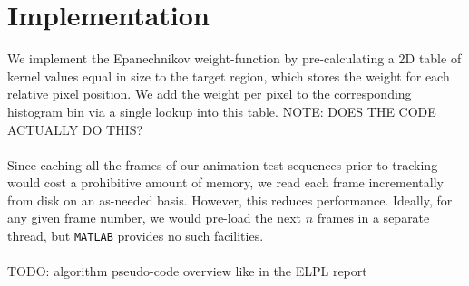 \documentclass[a4paper,11pt]{article}
\begin{document}
	\section{Implementation}
		We implement the Epanechnikov weight-function by pre-calculating a 2D
		table of kernel values equal in size to the target region, which stores
		the weight for each relative pixel position. We add the weight per pixel
		to the corresponding histogram bin via a single lookup into this table.
		NOTE: DOES THE CODE ACTUALLY DO THIS?
		\\ \\
		Since caching all the frames of our animation test-sequences prior to
		tracking would cost a prohibitive amount of memory, we read each frame
		incrementally from disk on an as-needed basis. However, this reduces
		performance. Ideally, for any given frame number, we would pre-load the
		next $n$ frames in a separate thread, but \verb|MATLAB| provides no such
		facilities.
		\\ \\
		TODO: algorithm pseudo-code overview like in the ELPL report\\
\end{document}
